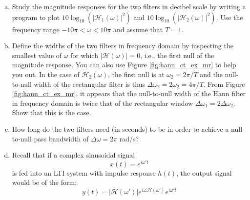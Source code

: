 \begin{enumerate}
\begin{enumerate}[a)]
    \item Study the magnitude responses for the two filters in decibel
        scale by writing a program to plot 
        $10 \log_{10}(|\mathcal{H}_1(\omega)|^2)$ and
        $10 \log_{10}(|\mathcal{H}_2(\omega)|^2)$. Use the frequency
        range $-10\pi < \omega < 10\pi$ and assume that $T=1$. 

      \item Define the widths of the two filters in frequency domain
        by inspecting the smallest value of $\omega$ for which
        $| \mathcal{H}(\omega)|=0$, i.e., the first null of the
        magnitude response. You can also use
        Figure \ref{fig:hann_ct_ex_mr} to help you out. In the case of
        $\mathcal{H}_2(\omega)$, the first null is at $\omega_2 =
        2\pi/T$ and the null-to-null width of the rectangular filter is
        thus $\Delta \omega_2 = 2\omega_2 = 4\pi/T$. From
        Figure \ref{fig:hann_ct_ex_mr}, it appears that the
        null-to-null width of the Hann filter in frequency domain is
        twice that of the rectangular window $\Delta \omega_1 =
        2\Delta \omega_2$. Show that this is the case.
        

        \item How long do the two filters need (in seconds) to be in
        order to achieve a null-to-null pass bandwidth of
        $\Delta \omega = 2\pi$ rad/s?



\item Recall that if a complex sinusoidal signal
    \begin{equation}
    x(t) = e^{i\omega' t}
    \end{equation}
    is fed into an LTI system with impulse response $h(t)$, the output signal would be of the form:
    \begin{equation}
    y(t) = |\mathcal{H}(\omega')|e^{i\angle \mathcal{H}(\omega')}e^{i\omega' t}
    \end{equation}
    

\end{enumerate}
\end{enumerate}
